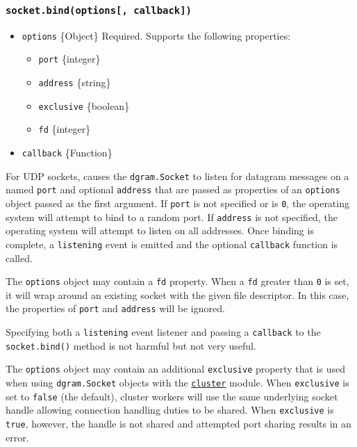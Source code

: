 \subsubsection{\texorpdfstring{\texttt{socket.bind(options{[},\ callback{]})}}{socket.bind(options{[}, callback{]})}}\label{socket.bindoptions-callback}

\begin{itemize}
\tightlist
\item
  \texttt{options} \{Object\} Required. Supports the following
  properties:

  \begin{itemize}
  \tightlist
  \item
    \texttt{port} \{integer\}
  \item
    \texttt{address} \{string\}
  \item
    \texttt{exclusive} \{boolean\}
  \item
    \texttt{fd} \{integer\}
  \end{itemize}
\item
  \texttt{callback} \{Function\}
\end{itemize}

For UDP sockets, causes the \texttt{dgram.Socket} to listen for datagram
messages on a named \texttt{port} and optional \texttt{address} that are
passed as properties of an \texttt{options} object passed as the first
argument. If \texttt{port} is not specified or is \texttt{0}, the
operating system will attempt to bind to a random port. If
\texttt{address} is not specified, the operating system will attempt to
listen on all addresses. Once binding is complete, a
\texttt{\textquotesingle{}listening\textquotesingle{}} event is emitted
and the optional \texttt{callback} function is called.

The \texttt{options} object may contain a \texttt{fd} property. When a
\texttt{fd} greater than \texttt{0} is set, it will wrap around an
existing socket with the given file descriptor. In this case, the
properties of \texttt{port} and \texttt{address} will be ignored.

Specifying both a \texttt{\textquotesingle{}listening\textquotesingle{}}
event listener and passing a \texttt{callback} to the
\texttt{socket.bind()} method is not harmful but not very useful.

The \texttt{options} object may contain an additional \texttt{exclusive}
property that is used when using \texttt{dgram.Socket} objects with the
\href{cluster.md}{\texttt{cluster}} module. When \texttt{exclusive} is
set to \texttt{false} (the default), cluster workers will use the same
underlying socket handle allowing connection handling duties to be
shared. When \texttt{exclusive} is \texttt{true}, however, the handle is
not shared and attempted port sharing results in an error.

